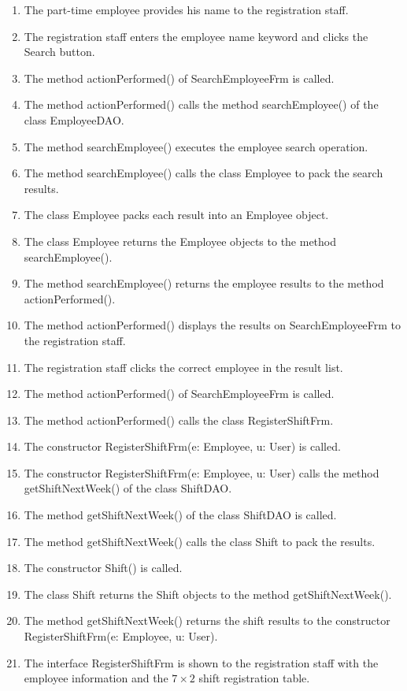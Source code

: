 \begin{enumerate}
    \item The part-time employee provides his name to the registration staff.
    \item The registration staff enters the employee name keyword and clicks the Search button.
    \item The method actionPerformed() of SearchEmployeeFrm is called.
    \item The method actionPerformed() calls the method searchEmployee() of the class EmployeeDAO.
    \item The method searchEmployee() executes the employee search operation.
    \item The method searchEmployee() calls the class Employee to pack the search results.
    \item The class Employee packs each result into an Employee object.
    \item The class Employee returns the Employee objects to the method searchEmployee().
    \item The method searchEmployee() returns the employee results to the method actionPerformed().
    \item The method actionPerformed() displays the results on SearchEmployeeFrm to the registration staff.
    \item The registration staff clicks the correct employee in the result list.
    \item The method actionPerformed() of SearchEmployeeFrm is called.
    \item The method actionPerformed() calls the class RegisterShiftFrm.
    \item The constructor RegisterShiftFrm(e: Employee, u: User) is called.
    \item The constructor RegisterShiftFrm(e: Employee, u: User) calls the method getShiftNextWeek() of the class ShiftDAO.
    \item The method getShiftNextWeek() of the class ShiftDAO is called.
    \item The method getShiftNextWeek() calls the class Shift to pack the results.
    \item The constructor Shift() is called.
    \item The class Shift returns the Shift objects to the method getShiftNextWeek().
    \item The method getShiftNextWeek() returns the shift results to the constructor RegisterShiftFrm(e: Employee, u: User).
    \item The interface RegisterShiftFrm is shown to the registration staff with the employee information and the $7 \times 2$ shift registration table.

\end{enumerate}
